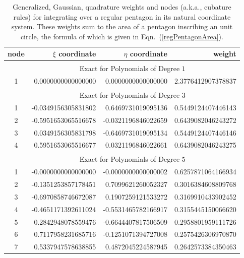 \begin{table}
    \centering
    \begin{tabular}{|c|rrr|}
        \hline
        node & \centering $\xi$ coordinate \phantom{123}  & 
        $\eta$ coordinate \phantom{123} & weight \phantom{12345} \\ \hline
        & \multicolumn{3}{|c|}{Exact for Polynomials of Degree $1^{\phantom{|^|}}$} \\ \hline
        1 & 0.0000000000000000 & 0.0000000000000000 &
        2.3776412907378837\vphantom{$|^{|^|}$} \\ 
        \hline
        & \multicolumn{3}{|c|}{Exact for Polynomials of Degree $3^{\phantom{|^|}}$} \\ \hline
        1 & -0.0349156305831802 &  0.6469731019095136 &
        0.5449124407446143\vphantom{$|^{|^|}$} \\
        2 & -0.5951653065516678 & -0.0321196846022659 & 0.6439082046243272 \\
        3 &  0.0349156305831798 & -0.6469731019095134 & 0.5449124407446146 \\
        4 &  0.5951653065516677 &  0.0321196846022661 & 0.6439082046243275 \\ 
        \hline
        & \multicolumn{3}{|c|}{Exact for Polynomials of Degree $5^{\phantom{|^|}}$} \\ \hline
        1 & -0.0000000000000000 & -0.0000000000000002 &
        0.6257871064166934\vphantom{$|^{|^|}$} \\
        2 & -0.1351253857178451 &  0.7099621260052327 & 0.3016384608809768 \\
        3 & -0.6970858746672087 &  0.1907259121533272 & 0.3169910433902452 \\ 
        4 & -0.4651171392611024 & -0.5531465782166917 & 0.3155445150066620 \\
        5 &  0.2842948078559476 & -0.6644407817506509 & 0.2958801959111726 \\
        6 &  0.7117958231685716 & -0.1251071394727008 & 0.2575426306970870 \\
        7 &  0.5337947578638855 &  0.4872045224587945 & 0.2642573384350463 \\
        \hline
    \end{tabular}
    \caption{Generalized, Gaussian, quadrature weights and nodes (a.k.a., cubature rules) for integrating over a regular pentagon in its natural coordinate system.  These weights sum to the area of a pentagon inscribing an unit circle, the formula of which is given in Eqn.~(\ref{regPentagonArea}).}
    \label{tabQuadrature}
\end{table}

